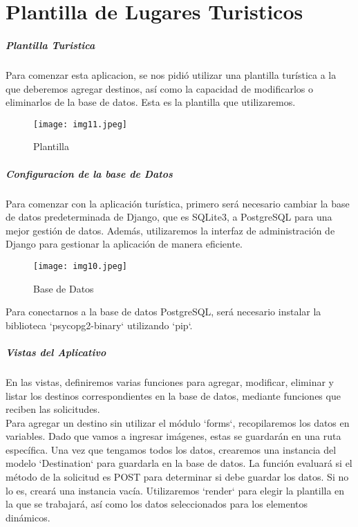 \documentclass[10pt, a4paper]{article}
\begin{document}
\section*{Plantilla de Lugares Turisticos}
	\subparagraph*{Plantilla Turistica}
	\begin{flushleft}
		Para comenzar esta aplicacion, se nos pidió utilizar una plantilla turística a la que deberemos agregar destinos, así como la capacidad de modificarlos o eliminarlos de la base de datos. Esta es la plantilla que utilizaremos.
	\end{flushleft}
	\begin{figure}[h]
		\centering
		\texttt{[image: img11.jpeg]}
		\caption{Plantilla}
	\end{figure}
	\vspace*{1cm}
	\subparagraph*{Configuracion de la base de Datos}
	\begin{flushleft}
		Para comenzar con la aplicación turística, primero será necesario cambiar la base de datos predeterminada de Django, que es SQLite3, a PostgreSQL para una mejor gestión de datos. Además, utilizaremos la interfaz de administración de Django para gestionar la aplicación de manera eficiente.	
	\end{flushleft}
	\begin{figure}[h]
		\centering
		\texttt{[image: img10.jpeg]}
		\caption{Base de Datos}
	\end{figure}
	\begin{flushleft}
		Para conectarnos a la base de datos PostgreSQL, será necesario instalar la biblioteca `psycopg2-binary` utilizando `pip`.
	\end{flushleft}
	\vspace*{12cm}
	\subparagraph*{Vistas del Aplicativo}
	\begin{flushleft}
		En las vistas, definiremos varias funciones para agregar, modificar, eliminar y listar los destinos correspondientes en la base de datos, mediante funciones que reciben las solicitudes.\\
		Para agregar un destino sin utilizar el módulo `forms`, recopilaremos los datos en variables. Dado que vamos a ingresar imágenes, estas se guardarán en una ruta específica. Una vez que tengamos todos los datos, crearemos una instancia del modelo `Destination` para guardarla en la base de datos. La función evaluará si el método de la solicitud es POST para determinar si debe guardar los datos. Si no lo es, creará una instancia vacía. Utilizaremos `render` para elegir la plantilla en la que se trabajará, así como los datos seleccionados para los elementos dinámicos.
	\end{flushleft}
\end{document}
